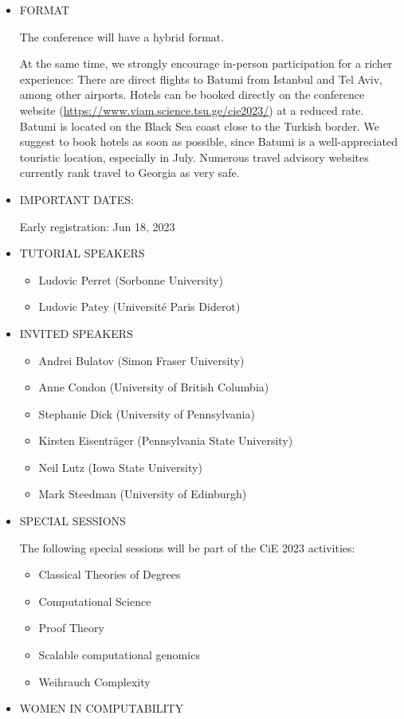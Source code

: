\documentclass[prodmode,acmtecs]{acmsmall} %
\begin{document}
\begin{itemize}\item  FORMAT 
 
  The conference will have a hybrid format.  
 
  At the same time, we strongly encourage in-person participation for a richer experience: There are direct flights to Batumi from Istanbul and Tel Aviv, among other airports. Hotels can be booked directly on the conference website (\href{https://www.viam.science.tsu.ge/cie2023/}{https://www.viam.science.tsu.ge/cie2023/}) at a reduced rate.  Batumi is located on the Black Sea coast close to the Turkish border. We suggest to book hotels as soon as possible, since Batumi is a well-appreciated touristic location, especially in July. Numerous travel advisory websites currently rank travel to Georgia as very safe. 
 
\item   IMPORTANT DATES: 
 
Early registration: Jun 18, 2023 
 
\item  TUTORIAL SPEAKERS 
 
\begin{itemize}\item  Ludovic Perret (Sorbonne University)
\item  Ludovic Patey (Université Paris Diderot)
\end{itemize} 
\item  INVITED SPEAKERS 
 
\begin{itemize}\item  Andrei Bulatov (Simon Fraser University)
\item  Anne Condon (University of British Columbia)
\item  Stephanie Dick (University of Pennsylvania)
\item  Kirsten Eisenträger (Pennsylvania State University)
\item  Neil Lutz (Iowa State University)
\item  Mark Steedman (University of Edinburgh)
\end{itemize} 
\item  SPECIAL SESSIONS 
 
  The following special sessions will be part of the CiE 2023 activities: 
 
\begin{itemize}\item  Classical Theories of Degrees
\item  Computational Science
\item  Proof Theory
\item  Scalable computational genomics
\item  Weihrauch Complexity
\end{itemize} 
\item  WOMEN IN COMPUTABILITY 
 

\end{itemize}
\end{document}
